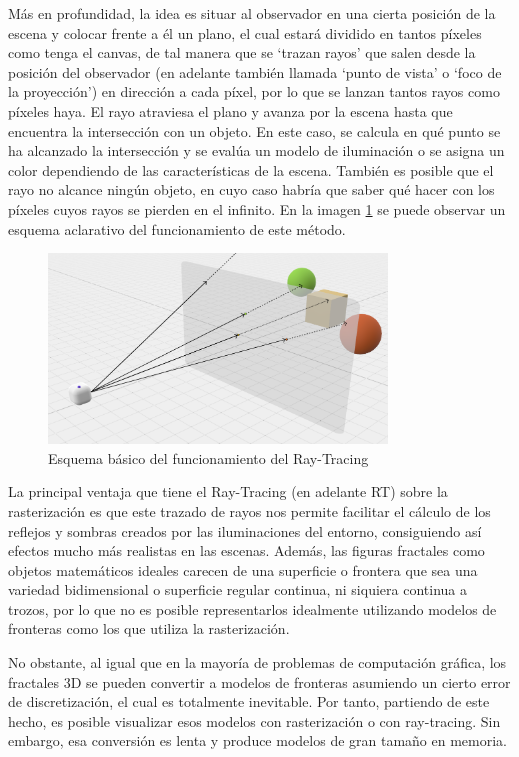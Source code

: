 Más en profundidad, la idea es situar al observador en una cierta posición de la escena y colocar frente a él un plano, el cual estará dividido en tantos píxeles como tenga el canvas, de tal manera que se `trazan rayos' que salen desde la posición del observador (en adelante también llamada `punto de vista' o `foco de la proyección') en dirección a cada píxel, por lo que se lanzan tantos rayos como píxeles haya. El rayo atraviesa el plano y avanza por la escena hasta que encuentra la intersección con un objeto. En este caso, se calcula en qué punto se ha alcanzado la intersección y se evalúa un modelo de iluminación o se asigna un color dependiendo de las características de la escena. También es posible que el rayo no alcance ningún objeto, en cuyo caso habría que saber qué hacer con los píxeles cuyos rayos se pierden en el infinito. En la imagen \ref{fig:RT} se puede observar un esquema aclarativo del funcionamiento de este método.

\begin{figure} [ht]
    \centering
    \includegraphics[width=9cm]{img/C8/RT.png}
    \caption{Esquema básico del funcionamiento del Ray-Tracing}
    \label{fig:RT}
\end{figure}

La principal ventaja que tiene el Ray-Tracing (en adelante RT) sobre la rasterización es que este trazado de rayos nos permite facilitar el cálculo de los reflejos y sombras creados por las iluminaciones del entorno, consiguiendo así efectos mucho más realistas en las escenas. Además, las figuras fractales como objetos matemáticos ideales carecen de una superficie o frontera que sea una variedad bidimensional o superficie regular continua, ni siquiera continua a trozos, por lo que no es posible representarlos idealmente utilizando modelos de fronteras como los que utiliza la rasterización. 

No obstante, al igual que en la mayoría de problemas de computación gráfica, los fractales 3D se pueden convertir a modelos de fronteras asumiendo un cierto error de discretización, el cual es totalmente inevitable. Por tanto, partiendo de este hecho, es posible visualizar esos modelos con rasterización o con ray-tracing. Sin embargo, esa conversión es lenta y produce modelos de gran tamaño en memoria. 

